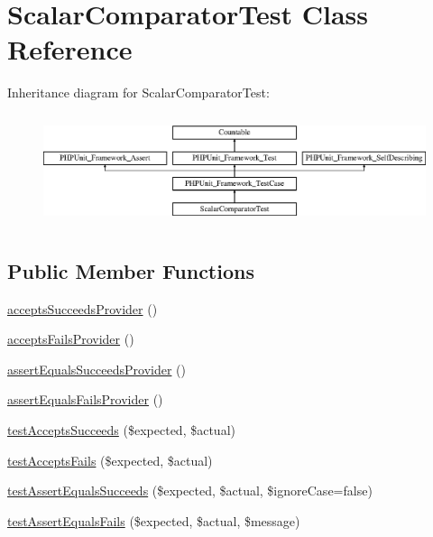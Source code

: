 \hypertarget{class_sebastian_bergmann_1_1_comparator_1_1_scalar_comparator_test}{}\section{Scalar\+Comparator\+Test Class Reference}
\label{class_sebastian_bergmann_1_1_comparator_1_1_scalar_comparator_test}
Inheritance diagram for Scalar\+Comparator\+Test\+:\begin{figure}[H]
\begin{center}
\leavevmode
\includegraphics[height=3.303835cm]{class_sebastian_bergmann_1_1_comparator_1_1_scalar_comparator_test}
\end{center}
\end{figure}
\subsection*{Public Member Functions}
\begin{DoxyCompactItemize}
\item 
\mbox{\hyperlink{class_sebastian_bergmann_1_1_comparator_1_1_scalar_comparator_test_a2ca71e8095ac10e058cd9d7a68da8608}{accepts\+Succeeds\+Provider}} ()
\item 
\mbox{\hyperlink{class_sebastian_bergmann_1_1_comparator_1_1_scalar_comparator_test_a9ea19e26cacbca06356c2f229079f8a1}{accepts\+Fails\+Provider}} ()
\item 
\mbox{\hyperlink{class_sebastian_bergmann_1_1_comparator_1_1_scalar_comparator_test_acb6bc1b6e9d32990bdd287f8b590a5fa}{assert\+Equals\+Succeeds\+Provider}} ()
\item 
\mbox{\hyperlink{class_sebastian_bergmann_1_1_comparator_1_1_scalar_comparator_test_a3cc10e39239b6e3f3fda1d34c0fb1c14}{assert\+Equals\+Fails\+Provider}} ()
\item 
\mbox{\hyperlink{class_sebastian_bergmann_1_1_comparator_1_1_scalar_comparator_test_a907ea73398b22f4a8cf37728cfc981e3}{test\+Accepts\+Succeeds}} (\$expected, \$actual)
\item 
\mbox{\hyperlink{class_sebastian_bergmann_1_1_comparator_1_1_scalar_comparator_test_afe5eff1a1b7049f973a035117a7e0df1}{test\+Accepts\+Fails}} (\$expected, \$actual)
\item 
\mbox{\hyperlink{class_sebastian_bergmann_1_1_comparator_1_1_scalar_comparator_test_af2b85b1407ee7e6fec46942809ee45ea}{test\+Assert\+Equals\+Succeeds}} (\$expected, \$actual, \$ignore\+Case=false)
\item 
\mbox{\hyperlink{class_sebastian_bergmann_1_1_comparator_1_1_scalar_comparator_test_a22eae8d48f386273d598d4fc73bc2476}{test\+Assert\+Equals\+Fails}} (\$expected, \$actual, \$message)
\end{DoxyCompactItemize}
